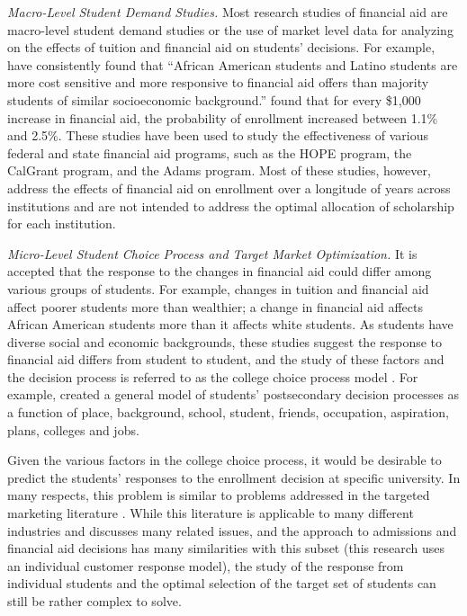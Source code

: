 \documentclass[12pt,english]{report}
\begin{document}
\vspace{0.1in}
\noindent \textit{Macro-Level Student Demand Studies.} 
Most research studies of financial aid are  macro-level student demand studies or the use of market level data for analyzing on the effects of tuition and financial aid on students' decisions.  For example, \citet{Hossler1989} have consistently found that ``African American students and Latino students are more cost sensitive and more responsive to financial aid offers than majority students of similar socioeconomic background.''  \citet{Braunstein1999} found that for every \$1,000 increase in financial aid, the probability  of  enrollment increased between 1.1\% and 2.5\%.  These studies have been used to study the effectiveness of various federal and state financial aid programs, such as the HOPE program, the CalGrant program, and the Adams program.  Most of these studies, however, address the effects of financial aid on enrollment over a longitude of years across institutions and are not intended to address the optimal  allocation of scholarship for each institution. 

\vspace{0.1in}
\noindent \textit{Micro-Level Student Choice Process and Target Market Optimization.} 
It is accepted that the response to the changes in financial aid could differ among various groups of students. For example, changes in tuition and financial aid affect poorer students more than wealthier; a change in financial aid affects African American students more than it affects white students. As students have diverse social and economic backgrounds, these studies suggest the response to financial aid differs from student to student, and the study of these factors and the decision process is referred  to as the college choice process model \citep{Paulsen1990}. For example, \citet{Jackson1978} created a general model of students' postsecondary decision processes as a function of place, background, school, student, friends, occupation, aspiration, plans, colleges and jobs.

Given the various factors in the college choice process, it would be desirable to predict the students' responses to the enrollment decision at specific university.  In many respects, this problem is similar to problems addressed in the targeted marketing literature \citep{Belloni2012}. While this literature is applicable to many different industries and discusses many related issues, and the approach to admissions and financial aid decisions has many similarities with this subset (this research uses an individual customer response model), the study of the response from individual students and the optimal selection of the target set of students can still be rather complex to solve.
\end{document}
